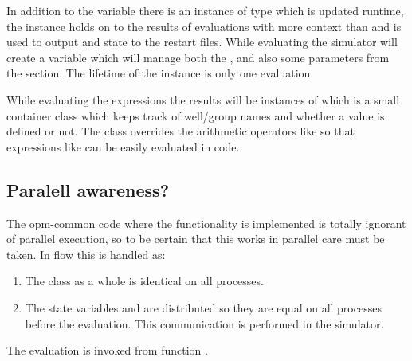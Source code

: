 In addition to the  variable there is an instance of
type  which is updated runtime, the 
instance holds on to the results of \udq{} evaluations with more context than
 and is used to output \udq{} and  state to the
restart files. While evaluating the simulator will create a 
variable which will manage both the ,
 and also some \udq{} parameters from the 
section. The lifetime of the  instance is only one \udq{}
evaluation.

While evaluating the \udq{} expressions the results will be instances of
 which is a small container class which keeps track of
well/group names and whether a value is defined or not. The 
class overrides the arithmetic operators like 
so that expressions like  can be easily evaluated in code.

\subsection*{Paralell awareness?}
The opm-common code where the \udq{} functionality is implemented is totally
ignorant of parallel execution, so to be certain that this works in parallel
care must be taken. In flow this is handled as:
\begin{enumerate}
  \item The  class as a whole is identical on all
    processes.
  \item The state variables  and 
    are distributed so they are equal on all processes before the \udq{}
    evaluation. This communication is performed in the simulator.
\end{enumerate}
The \udq{} evaluation is invoked from
 function
.



